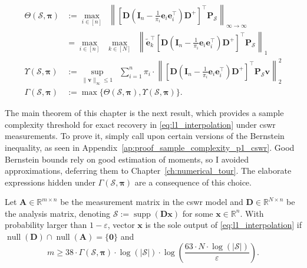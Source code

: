\begin{definition}
    \begin{align}
        \Theta (\mathcal{S}, \bm{\pi}) & := \underset{i \in [n]}{\max} \enspace \left \| \left [ \mathbf{D} \left ( \mathbf{I}_n - \frac{1}{\pi_{i}}\mathbf{e}_{i} \mathbf{e}_{i}^\top \right ) \mathbf{D}^{+} \right ]^\top \mathbf{P}_{\mathcal{S}}\right \|_{\infty \to \infty} \\
        & = \underset{i \in [n]}{\max} \enspace \underset{k \in [N]}{\max} \enspace \left \| \tilde{\mathbf{e}}_k^{\top} \left [ \mathbf{D} \left ( \mathbf{I}_n - \frac{1}{\pi_{i}}\mathbf{e}_{i} \mathbf{e}_{i}^\top \right ) \mathbf{D}^{+} \right ]^\top \mathbf{P}_{\mathcal{S}}\right \|_{1} \\
        \Upsilon (\mathcal{S}, \bm{\pi}) & := \underset{\|\mathbf{v}\|_\infty \leq 1}{\sup} \enspace \sum_{i=1}^{n} \pi_i \cdot \left \| \left [ \mathbf{D} \left ( \mathbf{I}_n - \frac{1}{\pi_{i}}\mathbf{e}_{i} \mathbf{e}_{i}^\top \right ) \mathbf{D}^{+} \right ]^\top \mathbf{P}_{\mathcal{S}} \mathbf{v} \right \|_{2}^2\\
        \Gamma (\mathcal{S}, \bm{\pi}) & := \max \{ \Theta (\mathcal{S}, \bm{\pi}), \Upsilon (\mathcal{S}, \bm{\pi})\}.
    \end{align}
    \label{def:sample_complexity_parameters}
\end{definition}

The main theorem of this chapter is the next result, which provides a sample complexity threshold for exact recovery in \eqref{eq:l1_interpolation} under \acrshort{cswr} measurements. To prove it, simply call upon certain versions of the Bernstein inequality, as seen in Appendix~\ref{ap:proof_sample_complexity_p1_cswr}. Good Bernstein bounds rely on good estimation of moments, so I avoided approximations, deferring them to Chapter~\ref{ch:numerical_tour}. The elaborate expressions hidden under $\Gamma (\mathcal{S}, \bm{\pi})$ are a consequence of this choice.

\begin{theorem}\label{thm:sample_complexity_p1_cswr}
    Let $\mathbf{A} \in \mathbb{R}^{m \times n}$ be the measurement matrix in the \acrshort{cswr} model and $\mathbf{D} \in \mathbb{R}^{N \times n}$ be the analysis matrix, denoting $\mathcal{S} := \operatorname{supp}\left ( \mathbf{Dx} \right )$ for some $\mathbf{x} \in \mathbb{R}^{n}$. With probability larger than $1 - \varepsilon$, vector $\mathbf{x}$ is the sole output of \eqref{eq:l1_interpolation} if $\operatorname{null} \left ( \mathbf{D} \right ) \cap \operatorname{null} \left ( \mathbf{A} \right ) = \{ \mathbf{0} \}$ and
    \begin{equation}
        m \geq 38 \cdot \Gamma(\mathcal{S}, \bm{\pi}) \cdot \log(|\mathcal{S}|) \cdot \log \left ( \frac{63 \cdot N \cdot\log (|\mathcal{S}|)}{\varepsilon} \right ).
    \end{equation}
\end{theorem}

